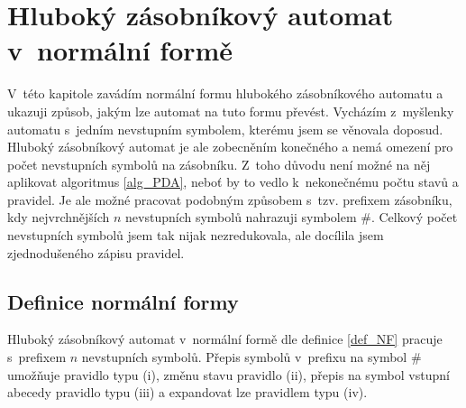\chapter{Hluboký zásobníkový automat v~normální formě} \label{kap_pda_NF}

V~této kapitole zavádím normální formu hlubokého zásobníkového automatu a ukazuji způsob, jakým lze automat na tuto formu převést. Vycházím z~myšlenky automatu s~jedním nevstupním symbolem, kterému jsem se věnovala doposud. Hluboký zásobníkový automat je ale zobecněním konečného a nemá omezení pro počet nevstupních symbolů na zásobníku. Z~toho důvodu není možné na něj aplikovat algoritmus \ref{alg_PDA}, neboť by to vedlo k~nekonečnému počtu stavů a pravidel. Je ale možné pracovat podobným způsobem s~tzv. prefixem zásobníku, kdy nejvrchnějších $n$ nevstupních symbolů nahrazuji symbolem $\#$. Celkový počet nevstupních symbolů jsem tak nijak nezredukovala, ale docílila jsem zjednodušeného zápisu pravidel.




\section{Definice normální formy}

Hluboký zásobníkový automat v~normální formě dle definice \ref{def_NF} pracuje s~prefixem $n$ nevstupních symbolů. Přepis symbolů v~prefixu na symbol $\#$ umožňuje pravidlo typu (i), změnu stavu pravidlo (ii), přepis na symbol vstupní abecedy pravidlo typu (iii) a expandovat lze pravidlem typu (iv). 

